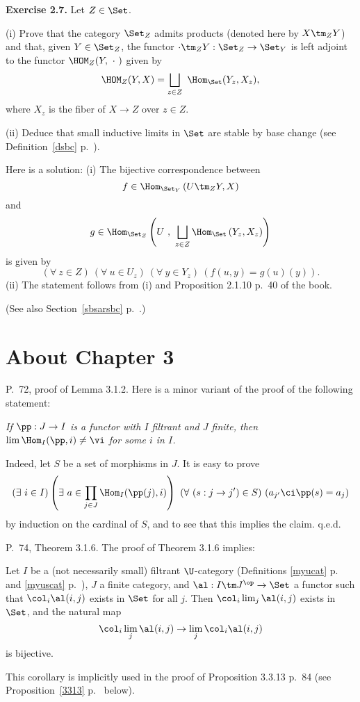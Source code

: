 \documentclass[12pt]{article}
\theoremstyle{remark}
\theoremstyle{definition}
\begin{document}
\nn\textbf{Exercise 2.7.} Let $Z\in\Set$.

\nn(i) Prove that the category $\Set_Z$ admits products (denoted here by $X\tm_Z Y$) and that, given $Y\in\Set_Z$, the functor $\cdot\tm_ZY:\Set_Z\to\Set_Y$ is left adjoint to the functor $\HOM_Z(Y,\ \cdot\ )$ given by 
$$
\HOM_Z(Y, X)=\bigsqcup_{z\in Z}\ \Hom_{\Set}(Y_z,X_z),
$$ 
where $X_z$ is the fiber of $X\to Z$ over $z\in Z$.

\nn(ii) Deduce that small inductive limits in $\Set$ are stable by base change (see Definition~\ref{dsbc} p.~).

Here is a solution: (i) The bijective correspondence between 
$$
f\in\Hom_{\Set_Y}\left(U\tm_ZY,X\right)
$$ 
and 
$$
g\in\Hom_{\Set_Z}\left(U\ ,\ \bigsqcup_{z\in Z}\Hom_\Set\left(Y_z,X_z\right)\right)
$$ 
is given by 
$$
(\forall\ z\in Z)\ \left(\forall\ u\in U_z\right)\ \left(\forall\ y\in Y_z\right)\ (f(u,y)=g(u)(y)).
$$ 
(ii) The statement follows from (i) and Proposition 2.1.10 p.~40 of the book.

(See also Section~\ref{sbsarsbc} p.~.)


\section{About Chapter 3}


\begin{s} 
P.~72, proof of Lemma 3.1.2. Here is a minor variant of the proof of the following statement: 

\emph{If $\pp:J\to I$ is a functor with $I$ filtrant and $J$ finite, then $\lim\Hom_I(\pp,i)\neq\vi$ for some $i$ in $I$.} 

Indeed, let $S$ be a set of morphisms in $J$. It is easy to prove 
$$
(\exists\ i\in I)\left(\exists\ a\in\prod_{j\in J}\Hom_I(\pp(j),i)\right)\ (\forall\ (s:j\to j')\in S)\ (a_{j'}\ci\pp(s)=a_j) 
$$ 
by induction on the cardinal of $S$, and to see that this implies the claim. q.e.d.
\end{s}


\begin{s} 
P.~74, Theorem 3.1.6. The proof of Theorem 3.1.6 implies: 
\begin{prop}
Let $I$ be a (not necessarily small) filtrant $\U$-category (Definitions \ref{myucat} p.~ and \ref{myuscat} p.~), $J$ a finite category, and $\al:I\tm J^{\op}\to\Set$ a functor such that $\col_i\al(i,j)$ exists in $\Set$ for all $j$. Then $\col_i\lim_j\al(i,j)$ exists in $\Set$, and the natural map 
$$
\col_i\lim_j\al(i,j)\to
\lim_j\col_i\al(i,j)
$$ 
is bijective. 
\end{prop} 
This corollary is implicitly used in the proof of Proposition 3.3.13 p.~84 (see Proposition~\ref{3313} p.~ below).
\end{s}
\end{document}
